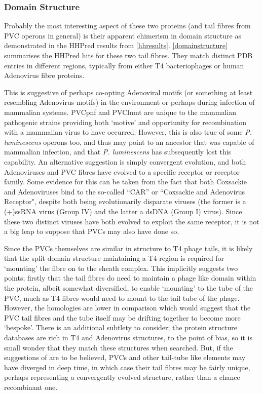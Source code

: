 \subsubsection{Domain Structure}\label{domainstructuresection}
Probably the most interesting aspect of these two proteins (and tail fibres from PVC operons in general) is their apparent chimerism in domain structure as demonstrated in the HHPred results from \vref{hhresults}. \vref{domainstructure} summarises the HHPred hits for these two tail fibres. They match distinct PDB entries in different regions, typically from either T4 bacteriophages or human Adenovirus fibre proteins.

This is suggestive of \Pa{} perhaps co-opting Adenoviral motifs (or something at least resembling Adenovirus motifs) in the environment or perhaps during infection of mammalian systems. PVCpnf and PVClumt are unique to the mammalian pathogenic strains providing both `motive' and opportunity for recombination with a mammalian virus to have occurred. However, this is also true of some \emph{P. luminescens} operons too, and thus may point to an ancestor that was capable of mammalian infection, and that \emph{P. luminescens} has subsequently lost this capability. An alternative suggestion is simply convergent evolution, and both Adenoviruses and PVC fibres have evolved to a specific receptor or receptor family. Some evidence for this can be taken from the fact that both Coxsackie and Adenoviruses bind to the so-called ``CAR'' or ``Coxsackie and Adenovirus Receptor", despite both being evolutionarily disparate viruses (the former is a (+)ssRNA virus (Group IV) and the latter a dsDNA (Group I) virus). Since these two distinct viruses have both evolved to exploit the same receptor, it is not a big leap to suppose that PVCs may also have done so.

Since the PVCs themselves are similar in structure to T4 phage tails, it is likely that the split domain structure maintaining a T4 region is required for `mounting' the fibre on to the sheath complex. This implicitly suggests two points; firstly that the tail fibres do need to maintain a phage like domain within the protein, albeit somewhat diversified, to enable `mounting' to the tube of the PVC, much as T4 fibres would need to mount to the tail tube of the phage. However, the homologies are lower in comparison which would suggest that the PVC tail fibres and the tube itself may be drifting together to become more `bespoke'. There is an additional subtlety to consider; the protein structure databases are rich in T4 and Adenovirus structures, to the point of bias, so it is small wonder that they match these structures when searched. But, if the suggestions of \cite{Sarris2014} are to be believed, PVCs and other tail-tube like elements may have diverged in deep time, in which case their tail fibres may be fairly unique, perhaps representing a convergently evolved structure, rather than a chance recombinant one.


